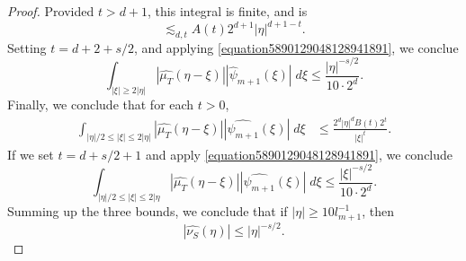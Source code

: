 \documentclass[12pt,reqno]{amsart}
\begin{document}
\begin{proof}
    Provided $t > d + 1$, this integral is finite, and is
    \[ \lesssim_{d,t} A(t) 2^{d + 1} |\eta|^{d + 1 - t}. \]
    Setting $t = d + 2 + s/2$, and applying \eqref{equation5890129048128941891}, we conclue
    \[ \int_{|\xi| \geq 2|\eta|} |\widehat{\mu_T}(\eta - \xi)| |\widehat{\psi}_{m+1}(\xi)|\; d\xi \leq \frac{|\eta|^{-s/2}}{10 \cdot 2^d}. \]
    Finally, we conclude that for each $t > 0$,
    \begin{align*}
        \int_{|\eta|/2 \leq |\xi| \leq 2|\eta|} |\widehat{\mu_T}(\eta - \xi)| |\widehat{\psi_{m+1}}(\xi)|\; d\xi &\leq \frac{2^d |\eta|^d B(t) 2^t}{|\xi|^t}.
    \end{align*}
    If we set $t = d + s/2 + 1$ and apply \eqref{equation5890129048128941891}, we conclude
    \[ \int_{|\eta|/2 \leq |\xi| \leq 2|\eta} |\widehat{\mu_T}(\eta - \xi)| |\widehat{\psi_{m+1}}(\xi)|\; d\xi \leq \frac{|\xi|^{-s/2}}{10 \cdot 2^d}. \]
    Summing up the three bounds, we conclude that if $|\eta| \geq 10 l_{m+1}^{-1}$, then
    \[ |\widehat{\nu_S}(\eta)| \leq |\eta|^{-s/2}. \]
\end{proof}
\end{document}
